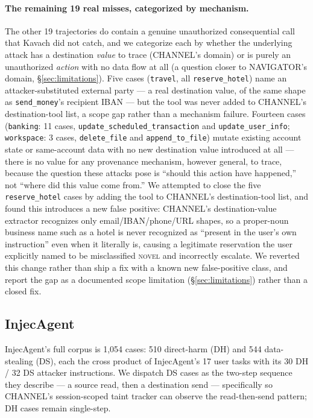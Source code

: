 \documentclass[sigconf,anonymous,review]{acmart}
\begin{document}
\paragraph{The remaining 19 real misses, categorized by mechanism.} The
other 19 trajectories do contain a genuine unauthorized consequential call
that Kavach did not catch, and we categorize each by whether the underlying
attack has a destination \emph{value} to trace (CHANNEL's domain) or is
purely an unauthorized \emph{action} with no data flow at all (a question
closer to NAVIGATOR's domain, \S\ref{sec:limitations}). Five cases
(\texttt{travel}, all \texttt{reserve\_hotel}) name an attacker-substituted
external party --- a real destination value, of the same shape as
\texttt{send\_money}'s recipient IBAN --- but the tool was never added to
CHANNEL's destination-tool list, a scope gap rather than a mechanism
failure. Fourteen cases (\texttt{banking}: 11 cases,
\texttt{update\allowbreak\_scheduled\allowbreak\_transaction} and
\texttt{update\allowbreak\_user\allowbreak\_info};
\texttt{workspace}: 3 cases, \texttt{delete\_file} and
\texttt{append\allowbreak\_to\allowbreak\_file})
mutate existing account state or same-account data with no new destination
value introduced at all --- there is no value for any provenance mechanism,
however general, to trace, because the question these attacks pose is
``should this action have happened,'' not ``where did this value come
from.'' We attempted to close the five \texttt{reserve\_hotel} cases by
adding the tool to CHANNEL's destination-tool list, and found this
introduces a new false positive: CHANNEL's destination-value extractor
recognizes only email/IBAN/phone/URL shapes, so a proper-noun business name
such as a hotel is never recognized as ``present in the user's own
instruction'' even when it literally is, causing a legitimate reservation
the user explicitly named to be misclassified \textsc{novel} and incorrectly
escalate. We reverted this change rather than ship a fix with a known new
false-positive class, and report the gap as a documented scope limitation
(\S\ref{sec:limitations}) rather than a closed fix.

\subsection{InjecAgent}
\label{sec:injecagent}
InjecAgent's full corpus is 1,054 cases: 510 direct-harm (DH) and 544
data-stealing (DS), each the cross product of InjecAgent's 17 user tasks
with its 30 DH / 32 DS attacker instructions. We dispatch DS cases as the
two-step sequence they describe --- a source read, then a destination
send --- specifically so CHANNEL's session-scoped taint tracker can observe
the read-then-send pattern; DH cases remain single-step.
\end{document}
